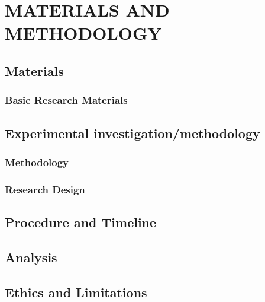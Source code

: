 ﻿\chapter{MATERIALS AND METHODOLOGY}
\section{Materials}
\subsection{Basic Research Materials}

\section{Experimental investigation/methodology}
\subsection{Methodology}
\subsection{Research Design}

\section{Procedure and Timeline}
\section{Analysis}
\section{Ethics and Limitations}
